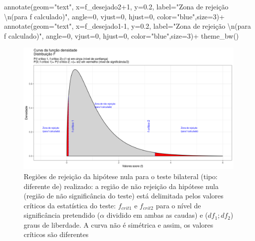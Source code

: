 \documentclass[
]{book}
\newenvironment{Shaded}{\begin{snugshade}}{\end{snugshade}}
\newcommand{\AttributeTok}[1]{\textcolor[rgb]{0.77,0.63,0.00}{#1}}
\newcommand{\DecValTok}[1]{\textcolor[rgb]{0.00,0.00,0.81}{#1}}
\newcommand{\FloatTok}[1]{\textcolor[rgb]{0.00,0.00,0.81}{#1}}
\newcommand{\FunctionTok}[1]{\textcolor[rgb]{0.00,0.00,0.00}{#1}}
\newcommand{\NormalTok}[1]{#1}
\newcommand{\SpecialCharTok}[1]{\textcolor[rgb]{0.00,0.00,0.00}{#1}}
\newcommand{\StringTok}[1]{\textcolor[rgb]{0.31,0.60,0.02}{#1}}
\begin{document}
\begin{Shaded}
\begin{Highlighting}[]
  \FunctionTok{annotate}\NormalTok{(}\AttributeTok{geom=}\StringTok{"text"}\NormalTok{, }\AttributeTok{x=}\NormalTok{f\_desejado2}\SpecialCharTok{+}\DecValTok{1}\NormalTok{, }\AttributeTok{y=}\FloatTok{0.2}\NormalTok{, }\AttributeTok{label=}\StringTok{"Zona de rejeição  }\SpecialCharTok{\textbackslash{}n}\StringTok{(para f calculado)"}\NormalTok{, }\AttributeTok{angle=}\DecValTok{0}\NormalTok{, }\AttributeTok{vjust=}\DecValTok{0}\NormalTok{, }\AttributeTok{hjust=}\DecValTok{0}\NormalTok{, }\AttributeTok{color=}\StringTok{"blue"}\NormalTok{,}\AttributeTok{size=}\DecValTok{3}\NormalTok{)}\SpecialCharTok{+}
  \FunctionTok{annotate}\NormalTok{(}\AttributeTok{geom=}\StringTok{"text"}\NormalTok{, }\AttributeTok{x=}\NormalTok{f\_desejado1}\DecValTok{{-}1}\NormalTok{, }\AttributeTok{y=}\FloatTok{0.2}\NormalTok{, }\AttributeTok{label=}\StringTok{"Zona de rejeição  }\SpecialCharTok{\textbackslash{}n}\StringTok{(para f calculado)"}\NormalTok{, }\AttributeTok{angle=}\DecValTok{0}\NormalTok{, }\AttributeTok{vjust=}\DecValTok{0}\NormalTok{, }\AttributeTok{hjust=}\DecValTok{0}\NormalTok{, }\AttributeTok{color=}\StringTok{"blue"}\NormalTok{,}\AttributeTok{size=}\DecValTok{3}\NormalTok{)}\SpecialCharTok{+}
  \FunctionTok{theme\_bw}\NormalTok{()}
\end{Highlighting}
\end{Shaded}

\hfill\break

\begin{figure}

{\centering \includegraphics[width=1\linewidth]{images11/f_test_1} 

}

\caption{Regiões de rejeição da hipótese nula para o teste bilateral (tipo: diferente de) realizado: a região de não rejeição da hipótese nula (região de não significância do teste) está delimitada pelos valores críticos da estatística do teste: $f_{crit1}$ e $f_{crit2}$ para o nível de significância pretendido ($\alpha$ dividido em ambas as caudas) e ($df_{1}; df_{2}$) graus de liberdade. A curva não é simétrica e assim, os valores críticos são diferentes}\label{fig:fig86}
\end{figure}
\end{document}
